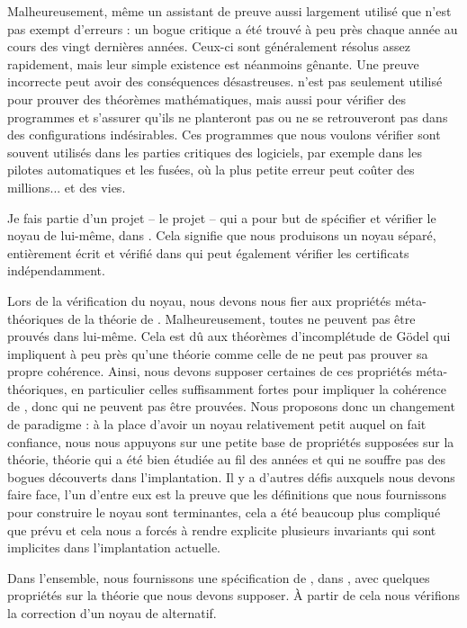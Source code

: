 Malheureusement, même un assistant de preuve aussi largement utilisé que \Coq
n'est pas exempt d'erreurs : un bogue critique a été trouvé à peu près chaque
année au cours des vingt dernières années. Ceux-ci sont généralement résolus
assez rapidement, mais leur simple existence est néanmoins gênante.
Une preuve incorrecte peut avoir des conséquences désastreuses. \Coq n'est pas
seulement utilisé pour prouver des théorèmes mathématiques, mais aussi pour
vérifier des programmes et s'assurer qu'ils ne planteront pas ou ne se
retrouveront pas dans des configurations indésirables. Ces programmes que nous
voulons vérifier sont souvent utilisés dans les parties critiques des logiciels,
par exemple dans les pilotes automatiques et les fusées, où la plus petite
erreur peut coûter des millions... et des vies.

Je fais partie d'un projet -- le projet \MetaCoq\xspace -- qui a pour but de
spécifier et vérifier le noyau de \Coq lui-même, dans \Coq. Cela signifie que
nous produisons un noyau séparé, entièrement écrit et vérifié dans \Coq qui peut
également vérifier les certificats indépendamment.

Lors de la vérification du noyau, nous devons nous fier aux propriétés
méta-théoriques de la théorie de \Coq. Malheureusement, toutes ne peuvent pas
être prouvés dans \Coq lui-même.
%
Cela est dû aux théorèmes d'incomplétude de Gödel qui impliquent à peu près
qu'une théorie comme celle de \Coq ne peut pas prouver sa propre cohérence.
Ainsi, nous devons supposer certaines de ces propriétés méta-théoriques, en
particulier celles suffisamment fortes pour impliquer la cohérence de \Coq, donc
qui ne peuvent pas être prouvées.
Nous proposons donc un changement de paradigme : à la place d'avoir un noyau
relativement petit auquel on fait confiance, nous nous appuyons sur une petite
base de propriétés supposées sur la théorie, théorie qui a été bien étudiée au
fil des années et qui ne souffre pas des bogues découverts dans l'implantation.
Il y a d'autres défis auxquels nous devons faire face, l'un d'entre eux est la
preuve que les définitions que nous fournissons pour construire le noyau sont
terminantes, cela a été beaucoup plus compliqué que prévu et cela nous a forcés
à rendre explicite plusieurs invariants qui sont implicites dans l'implantation
actuelle.

Dans l'ensemble, nous fournissons une spécification de \Coq, dans \Coq, avec
quelques propriétés sur la théorie que nous devons supposer. À partir de cela
nous vérifions la correction d'un noyau de \Coq alternatif.

